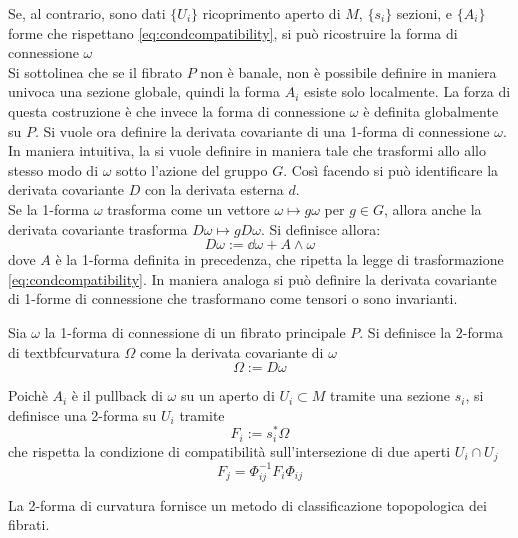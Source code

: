 Se, al contrario, sono dati $\{U_i\}$ ricoprimento aperto di $M$, $\{s_i\}$
sezioni, e $\{A_i\}$ forme che rispettano \ref{eq:condcompatibility}, si può
ricostruire la forma di connessione $\omega$\\
Si sottolinea che se il fibrato $P$ non è banale, non è possibile definire in
maniera univoca una sezione globale, quindi la forma $A_i$ esiste solo localmente.
La forza di questa costruzione è che invece la forma di connessione $\omega$
è definita globalmente su $P$.
Si vuole ora definire la derivata covariante di una
1-forma di connessione $\omega$.
In maniera intuitiva, la si vuole definire in maniera tale che trasformi allo
allo stesso modo di $\omega$ sotto l'azione del gruppo $G$. Così facendo si
può identificare la derivata covariante $D$ con la derivata esterna $d$.\\
Se la 1-forma $\omega$ trasforma come un vettore $\omega \mapsto g\omega$ per
$g \in G$, allora anche la derivata covariante trasforma $ D\omega \mapsto
g D\omega $. Si definisce allora:
   $$ D\omega := \dd\omega + A \wedge \omega $$
dove $A$ è la 1-forma definita in precedenza, che ripetta la legge di
trasformazione \ref{eq:condcompatibility}. In maniera analoga si può definire la
derivata covariante di 1-forme di connessione che trasformano come tensori o sono
invarianti.
\begin{definition}
   Sia $\omega$ la 1-forma di connessione di un fibrato principale $P$. Si definisce
   la 2-forma di textbf{curvatura} $\Omega$ come la derivata covariante di $\omega$
   $$ \Omega := D\omega $$
\end{definition}
Poichè $A_i$ è il pullback di $\omega$ su un aperto di $U_i \subset M$
tramite una sezione $s_i$, si definisce una 2-forma su $U_i$ tramite
\begin{equation} F_i := s_i^* \Omega \end{equation}
che rispetta la condizione di compatibilità sull'intersezione di due aperti
$U_i \cap U_j$
\begin{equation} F_j = \Phi_{ij}^{-1}F_i\Phi_{ij} \end{equation}

La 2-forma di curvatura fornisce un metodo di classificazione topopologica
dei fibrati.
